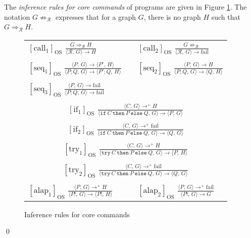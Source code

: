 \documentclass{llncs}
\newcommand{\R}{\mathcal{R}}
\newcommand{\dder}{\Rightarrow}
\newcommand{\tuple}[1]{\langle#1\rangle}
\newcommand{\failrm}{\mathrm{fail}}
\newcommand{\ifte}[3]{\mathtt{if}\ #1\ \mathtt{then}\ #2\ \mathtt{else}\ #3}
\newcommand{\tryte}[3]{\mathtt{try}\ #1\ \mathtt{then}\ #2\ \mathtt{else}\ #3}
\begin{document}
	\begin{definition}\label{def:core_sos_rules}\rm
		The \emph{inference rules for core commands} of programs are given in Figure \ref{fig:core_sos_rules}. The notation $G\not\Rightarrow_\R$ expresses that for a graph $G$, there is no graph $H$ such that $G\Rightarrow_\R H$.

	\begin{figure}[htb]
	\centering
	\begin{tabular}{lcl}
	$\mathrm{[call_1]}_\text{OS}$ $\frac{\displaystyle G \dder_\R H}{\displaystyle\tuple{\R,\,G} \to H}$ 
	&&
	$\mathrm{[call_2]}_\text{OS}$ $\frac{\displaystyle G \not\dder_\R}{\displaystyle\tuple{\R,\,G} \to \failrm}$
	\\\\
	$\mathrm{[seq_1]}_\text{OS}$ $\frac{\displaystyle \tuple{P,\, G} \to \tuple{P',\, H}}{\displaystyle \tuple{P;Q,\, G} \to \tuple{P';Q,\, H}}$ 
	&&
	$\mathrm{[seq_2]}_\text{OS}$ $\frac{\displaystyle \tuple{P,\, G} \to H}{\displaystyle \tuple{P;Q,\, G}\to \tuple{Q,\, H}}$
	\\\\
	$\mathrm{[seq_3]}_\text{OS}$ $\frac{\displaystyle \tuple{P,\, G} \to \failrm}{\displaystyle \tuple{P;Q,\, G}\to \failrm}$
	\\\\
	\multicolumn{3}{c}{$\mathrm{[if_1]}_\text{OS}$ $\frac{\displaystyle \tuple{C,\, G} \to^+ H}{\displaystyle \tuple{\ifte{C}{P}{Q},\, G}\to \tuple{P,\, G}}$}
	\\\\
	\multicolumn{3}{c}{$\mathrm{[if_2]}_\text{OS}$ $\frac{\displaystyle \tuple{C,\, G} \to^+ \failrm}{\displaystyle \tuple{\ifte{C}{P}{Q},\, G} \to \tuple{Q,\, G}}$}
	\\\\
	\multicolumn{3}{c}{$\mathrm{[try_1]}_\text{OS}$ $\frac{\displaystyle \tuple{C,\, G} \to^+ H}{\displaystyle \tuple{\tryte{C}{P}{Q},\, G}\to \tuple{P,\, H}}$}
	\\\\
	\multicolumn{3}{c}{$\mathrm{[try_2]}_\text{OS}$ $\frac{\displaystyle \tuple{C,\, G} \to^+ \failrm}{\displaystyle \tuple{\tryte{C}{P}{Q},\, G} \to \tuple{Q,\, G}}$}
	\\\\
	$\mathrm{[alap_1]}_\text{OS}$ $\frac{\displaystyle \tuple{P,\, G} \to^+ H}{\displaystyle \tuple{P!,\, G} \to \tuple{P!,\, H}}$
	&&
	$\mathrm{[alap_2]}_\text{OS}$ $\frac{\displaystyle \tuple{P,\, G} \to^+ \failrm}{\displaystyle \tuple{P!,\, G} \to G}$
	\end{tabular} 
	\caption{Inference rules for core commands}\label{fig:core_sos_rules}
	\end{figure}
		\qed
	\end{definition}
\end{document}
